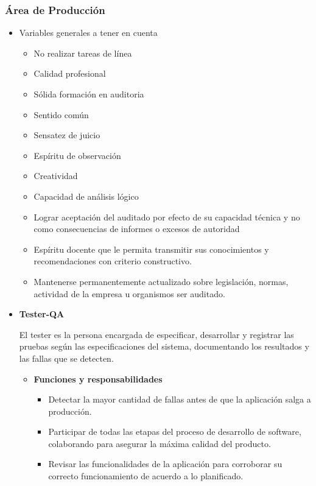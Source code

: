    \subsubsection{Área de Producción}
          \begin{itemize}
          \item Variables generales a tener en cuenta
              \begin{itemize}
                  \item  No realizar tareas de línea 
                  \item Calidad profesional 
                  \item Sólida formación en auditoria 
                  \item Sentido común 
                  \item Sensatez de juicio 
                  \item Espíritu de observación 
                  \item Creatividad 
                  \item Capacidad de análisis lógico 
                   \item Lograr aceptación del auditado por efecto de su capacidad técnica y no como consecuencias de informes o excesos de autoridad 
                   \item Espíritu docente que le permita transmitir sus conocimientos y recomendaciones con criterio constructivo. 
                   	\item     Mantenerse permanentemente actualizado sobre legislación, normas, actividad de la empresa u organismos  ser auditado.
              \end{itemize}
              
           \item \textbf{Tester-QA}
           
        El tester es la persona encargada de especificar, desarrollar y registrar las pruebas según las especificaciones del sistema, documentando los resultados y las fallas que se detecten.
			\begin{itemize}
			    \item \textbf{Funciones y responsabilidades}
            	
                \begin{itemize}
				    \item Detectar la mayor cantidad de fallas antes de que la aplicación salga a producción.
                    \item Participar de todas las etapas del proceso de desarrollo de software, colaborando para asegurar la máxima calidad del producto.
                    \item Revisar las funcionalidades de la aplicación para corroborar su correcto funcionamiento de acuerdo a lo planificado.
				\end{itemize}
            

\end{itemize}
\end{itemize}
